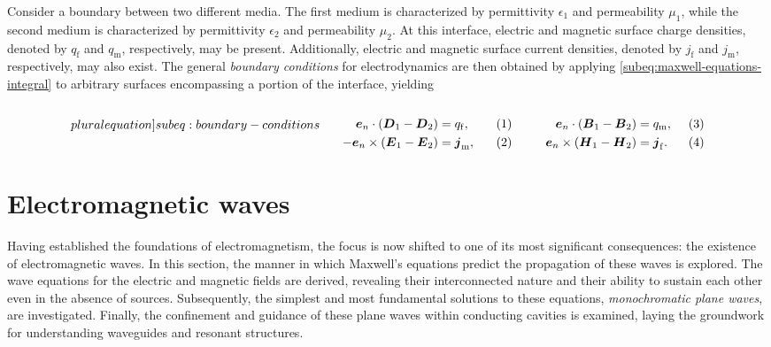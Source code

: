 \documentclass[11pt,a4paper,twoside,openany]{report}
\begin{document}
Consider a boundary between two different media. The first medium is characterized by permittivity $\epsilon_1$ and permeability $\mu_1$, while the second medium is characterized by permittivity $\epsilon_2$ and permeability $\mu_2$. At this interface, electric and magnetic surface charge densities, denoted by $q_{\mathrm f}$ and $q_{\mathrm m}$, respectively, may be present. Additionally, electric and magnetic surface current densities, denoted by $j_{\mathrm f}$ and $j_{\mathrm m}$, respectively, may also exist. The general \emph{boundary conditions} for electrodynamics are then obtained by applying \cref{subeq:maxwell-equations-integral} to arbitrary surfaces encompassing a portion of the interface, yielding\\
\begin{subequations}
    \label[pluralequation]{subeq:boundary-conditions}
    \noindent\centering
    \begin{minipage}{0.45\textwidth}
        \begin{align}
            \label{eq:boundary-conditions-d-normal}
            \vec e_n \cdot (\vec D_1 - \vec D_2) &= q_{\mathrm f},
        \\
            \label{eq:boundary-conditions-e-tangential}
            -\vec e_n \times (\vec E_1 - \vec E_2) &= \vec j_{\mathrm m},
        \end{align}
    \end{minipage}
    \hfill
    \begin{minipage}{0.45\textwidth}
        \begin{align}
            \label{eq:boundary-conditions-b-normal}
            \vec e_n \cdot (\vec B_1 - \vec B_2) &= q_{\mathrm m},
        \\
            \label{eq:boundary-conditions-H-tangential}
            \vec e_n \times (\vec H_1 - \vec H_2) &= \vec j_{\mathrm f}.
        \end{align}
    \end{minipage}
    \bigskip
\end{subequations}

\section{Electromagnetic waves}
\label{section:electromagnetic-waves}
Having established the foundations of electromagnetism, the focus is now shifted to one of its most significant consequences: the existence of electromagnetic waves. In this section, the manner in which Maxwell's equations predict the propagation of these waves is explored.  The wave equations for the electric and magnetic fields are derived, revealing their interconnected nature and their ability to sustain each other even in the absence of sources. Subsequently, the simplest and most fundamental solutions to these equations, \emph{monochromatic plane waves}, are investigated. Finally, the confinement and guidance of these plane waves within conducting cavities is examined, laying the groundwork for understanding waveguides and resonant structures.
\end{document}
